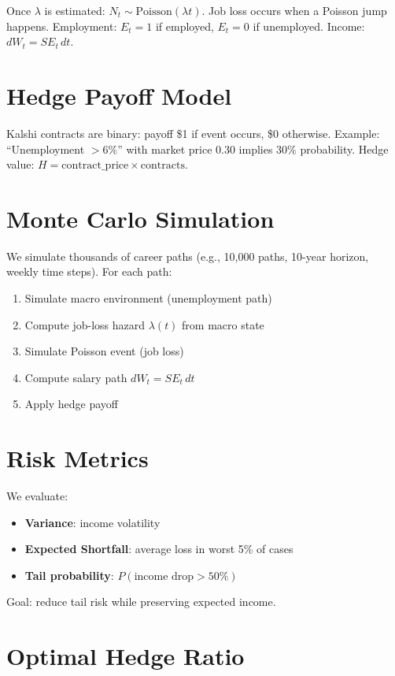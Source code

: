 \documentclass[11pt]{article}
\begin{document}
Once $\lambda$ is estimated: $N_t \sim \text{Poisson}(\lambda t)$. Job loss occurs when 
a Poisson jump happens. Employment: $E_t = 1$ if employed, $E_t = 0$ if unemployed.
Income: $dW_t = S E_t \, dt$.

\section{Hedge Payoff Model}

Kalshi contracts are binary: payoff \$1 if event occurs, \$0 otherwise. Example: 
``Unemployment $> 6\%$'' with market price 0.30 implies 30\% probability. 
Hedge value: $H = \text{contract\_price} \times \text{contracts}$.

\section{Monte Carlo Simulation}

We simulate thousands of career paths (e.g., 10,000 paths, 10-year horizon, 
weekly time steps). For each path:

\begin{enumerate}
\item Simulate macro environment (unemployment path)
\item Compute job-loss hazard $\lambda(t)$ from macro state
\item Simulate Poisson event (job loss)
\item Compute salary path $dW_t = S E_t \, dt$
\item Apply hedge payoff
\end{enumerate}

\section{Risk Metrics}

We evaluate:

\begin{itemize}
\item \textbf{Variance}: income volatility
\item \textbf{Expected Shortfall}: average loss in worst 5\% of cases
\item \textbf{Tail probability}: $P(\text{income drop} > 50\%)$
\end{itemize}

Goal: reduce tail risk while preserving expected income.

\section{Optimal Hedge Ratio}
\end{document}
